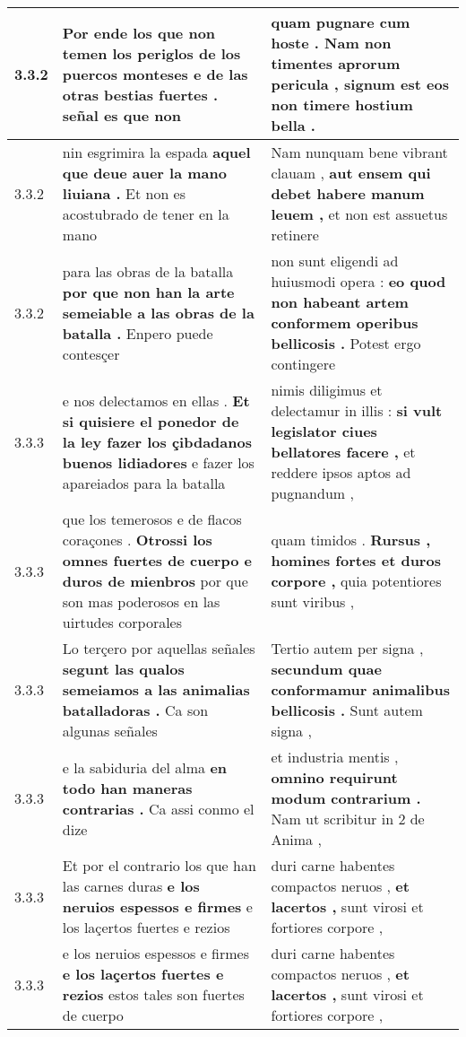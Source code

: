 \begin{tabular}{|p{1cm}|p{6.5cm}|p{6.5cm}|}
3.3.2 & Por ende los que non temen los periglos de los puercos monteses \textbf{ e de las otras bestias fuertes . } señal es que non & quam pugnare cum hoste . \textbf{ Nam non timentes aprorum pericula , } signum est eos non timere hostium bella . \\\hline
3.3.2 & nin esgrimira la espada \textbf{ aquel que deue auer la mano liuiana . } Et non es acostubrado de tener en la mano & Nam nunquam bene vibrant clauam , \textbf{ aut ensem qui debet habere manum leuem , } et non est assuetus retinere \\\hline
3.3.2 & para las obras de la batalla \textbf{ por que non han la arte semeiable a las obras de la batalla . } Enpero puede contesçer & non sunt eligendi ad huiusmodi opera : \textbf{ eo quod non habeant artem conformem operibus bellicosis . } Potest ergo contingere \\\hline
3.3.3 & e nos delectamos en ellas . \textbf{ Et si quisiere el ponedor de la ley fazer los çibdadanos buenos lidiadores } e fazer los apareiados para la batalla & nimis diligimus et delectamur in illis : \textbf{ si vult legislator ciues bellatores facere , } et reddere ipsos aptos ad pugnandum , \\\hline
3.3.3 & que los temerosos e de flacos coraçones . \textbf{ Otrossi los omnes fuertes de cuerpo e duros de mienbros } por que son mas poderosos en las uirtudes corporales & quam timidos . \textbf{ Rursus , homines fortes et duros corpore , } quia potentiores sunt viribus , \\\hline
3.3.3 & Lo terçero por aquellas señales \textbf{ segunt las qualos semeiamos a las animalias batalladoras . } Ca son algunas señales & Tertio autem per signa , \textbf{ secundum quae conformamur animalibus bellicosis . } Sunt autem signa , \\\hline
3.3.3 & e la sabiduria del alma \textbf{ en todo han maneras contrarias . } Ca assi conmo el dize & et industria mentis , \textbf{ omnino requirunt modum contrarium . } Nam ut scribitur in 2 de Anima , \\\hline
3.3.3 & Et por el contrario los que han las carnes duras \textbf{ e los neruios espessos e firmes } e los laçertos fuertes e rezios & duri carne habentes compactos neruos , \textbf{ et lacertos , } sunt virosi et fortiores corpore , \\\hline
3.3.3 & e los neruios espessos e firmes \textbf{ e los laçertos fuertes e rezios } estos tales son fuertes de cuerpo & duri carne habentes compactos neruos , \textbf{ et lacertos , } sunt virosi et fortiores corpore , \\\hline

\end{tabular}
